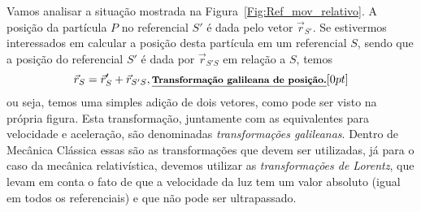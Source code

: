 Vamos analisar a situação mostrada na Figura~\ref{Fig:Ref_mov_relativo}. A posição da partícula $P$ no referencial $S'$ é dada pelo vetor $\vec{r}_{S'}$. Se estivermos interessados em calcular a posição desta partícula em um referencial $S$, sendo que a posição do referencial $S'$ é dada por $\vec{r}_{S'S}$ em relação a $S$, temos
\begin{equation}
  \vec{r}_S = \vec{r}_S' + \vec{r}_{S'S},\relax{\footnotesize\emph{\textbf{Transformação galileana de posição.}}}[0pt]
\end{equation}
%
ou seja, temos uma simples adição de dois vetores, como pode ser visto na própria figura. Esta transformação, juntamente com as equivalentes para velocidade e aceleração, são denominadas \emph{transformações galileanas}. Dentro de Mecânica Clássica essas são as transformações que devem ser utilizadas, já para o caso da mecânica relativística, devemos utilizar as \emph{transformações de Lorentz}, que levam em conta o fato de que a velocidade da luz tem um valor absoluto (igual em todos os referenciais) e que não pode ser ultrapassado.

